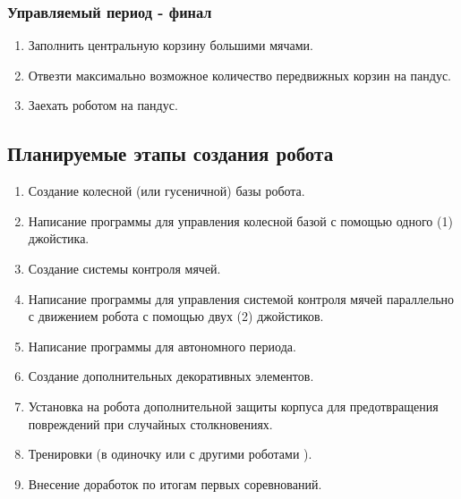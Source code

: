 \subsubsection{Управляемый период - финал}
\begin{enumerate}
	\item Заполнить центральную корзину большими мячами.
	\item Отвезти максимально возможное количество передвижных корзин на пандус.
	\item Заехать роботом на пандус. 
\end{enumerate}
\fillpage

\subsection{Планируемые этапы создания робота}
\begin{enumerate}
	\item Создание колесной (или гусеничной) базы робота.
	\item Написание программы для управления колесной базой с помощью одного (1) джойстика.
	\item Создание системы контроля мячей.
	\item Написание программы для управления системой контроля мячей параллельно с движением робота с помощью двух (2) джойстиков.
	\item Написание программы для автономного периода.
	\item Создание дополнительных декоративных элементов.
	\item Установка на робота дополнительной защиты корпуса для предотвращения повреждений при случайных столкновениях.
	\item Тренировки (в одиночку или с другими роботами ).
	\item Внесение доработок по итогам первых соревнований.
\end{enumerate}
\fillpage
